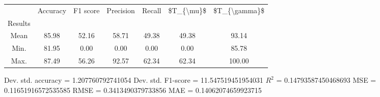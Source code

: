 \begin{tabular}{|c|c|c|c|c|c|c|}
\toprule
{} &  Accuracy &  F1 score &  Precision &  Recall &  \$T\_\{\textbackslash mu\}\$ &  \$T\_\{\textbackslash gamma\}\$ \\
Results &           &           &            &         &            &               \\
\hline
Mean    &     85.98 &     52.16 &      58.71 &   49.38 &      49.38 &         93.14 \\
Min.    &     81.95 &      0.00 &       0.00 &    0.00 &       0.00 &         85.78 \\
Max.    &     87.49 &     56.26 &      92.57 &   62.34 &      62.34 &        100.00 \\
\bottomrule
\end{tabular}

 Dev. std. accuracy = 1.207760792741054
 Dev. std. F1-score = 11.547519451954031
 $R^2$ = 0.14793587450468693
 MSE = 0.11651916572535585
 RMSE = 0.3413490379733856
 MAE = 0.14062074659923715